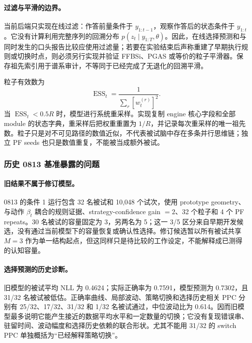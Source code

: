 \paragraph{过滤与平滑的边界。}
当前后端只实现在线过滤：作答前量条件于 $y_{1:t-1}$，观察作答后的状态条件于 $y_{1:t}$。它没有计算利用完整序列的回溯分布 $p(z_t\mid y_{1:T},\theta)$。因此，在线选择预测和与同时发生的口头报告比较应使用过滤量；若要在实验结束后声称重建了早期执行规则或切换时点，则必须另行实现并验证 FFBSi、PGAS 或等价的粒子平滑器。保存祖先索引用于谱系审计，不等同于已经完成了无退化的回溯平滑。

粒子有效数为
\begin{equation}
\operatorname{ESS}_t
=\frac{1}{\sum_r[w_t^{(r)}]^2}.
\label{eq:dynamic-ess}
\end{equation}
当 $\operatorname{ESS}_t<0.5R$ 时，模型进行系统重采样。实现复制 engine 核心字段和全部 module 的状态字典，重采样后把权重重置为 $1/R$，并记录每次重采样的唯一祖先数。粒子只是对不可见路径的数值近似，不代表被试脑中存在多条并行思维链；独立 PF seeds 也只是数值重复，不能被当成额外被试。


\subsubsection{历史 0813 基准暴露的问题}

\paragraph{旧结果不属于修订模型。}
0813 的条件 1 运行包含 32 名被试和 10,048 个试次，使用 prototype geometry、与动作 $\beta_t$ 耦合的规则证据、strategy-confidence gain $=2$、32 个粒子和 4 个 PF repeats。30 名被试的容量固定为 3，另两名为 5；这一 3/5 区分来自早期开发候选，没有通过当前模型下的容量恢复或确认性选择。修订候选暂以所有被试共享 $M=3$ 作为单一结构起点，但这同样只是待比较的工作设定，不能解释成已测得的认知容量。

\paragraph{选择预测的历史诊断。}
旧模型的被试平均 NLL 为 0.4624；实际正确率为 0.7591，模型预测为 0.7302，且 31/32 名被试被低估。正确率曲线、局部波动、策略切换和选择历史相关 PPC 分别有 25/32、17/32、31/32 和 1/32 名被试通过，中位波动比为 0.614。因而旧模型最多说明它能产生接近的数据平均水平和一定数量的切换；它没有复现错误串、驻留时间、波动幅度和选择历史依赖的联合形状。尤其不能用 31/32 的 switch PPC 单独概括为“已经解释策略切换”。

